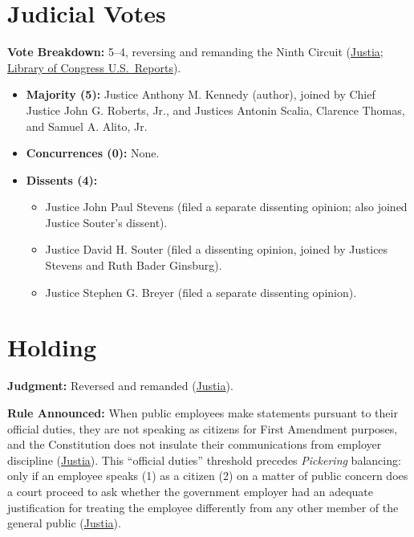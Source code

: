 \documentclass[12pt]{article}
\begin{document}
\section{Judicial Votes}

\textbf{Vote Breakdown:} 5--4, reversing and remanding the Ninth Circuit (\href{https://supreme.justia.com/cases/federal/us/547/410/}{Justia}; \href{https://tile.loc.gov/storage-services/service/ll/usrep/usrep547/usrep547410/usrep547410.pdf}{Library of Congress U.S.\ Reports}).

\begin{itemize}
  \item \textbf{Majority (5):} Justice Anthony M. Kennedy (author), joined by Chief Justice John G. Roberts, Jr., and Justices Antonin Scalia, Clarence Thomas, and Samuel A. Alito, Jr.
  \item \textbf{Concurrences (0):} None.
  \item \textbf{Dissents (4):}
  \begin{itemize}
    \item Justice John Paul Stevens (filed a separate dissenting opinion; also joined Justice Souter's dissent).
    \item Justice David H. Souter (filed a dissenting opinion, joined by Justices Stevens and Ruth Bader Ginsburg).
    \item Justice Stephen G. Breyer (filed a separate dissenting opinion).
  \end{itemize}
\end{itemize}

\section{Holding}

\textbf{Judgment:} Reversed and remanded (\href{https://supreme.justia.com/cases/federal/us/547/410/}{Justia}).

\textbf{Rule Announced:} When public employees make statements pursuant to their official duties, they are not speaking as citizens for First Amendment purposes, and the Constitution does not insulate their communications from employer discipline (\href{https://supreme.justia.com/cases/federal/us/547/410/}{Justia}). This ``official duties'' threshold precedes \textit{Pickering} balancing: only if an employee speaks (1) as a citizen (2) on a matter of public concern does a court proceed to ask whether the government employer had an adequate justification for treating the employee differently from any other member of the general public (\href{https://supreme.justia.com/cases/federal/us/547/410/}{Justia}).
\end{document}
